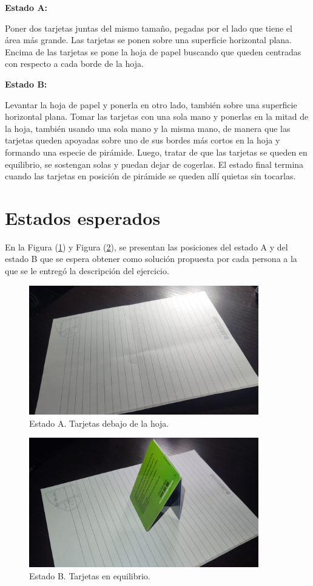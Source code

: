 \documentclass{article}
\begin{document}
\vspace{0.3cm}
\textbf{Estado A:}
\vspace{0.3cm}

Poner dos tarjetas juntas del mismo tamaño, pegadas por el lado que tiene el área más grande. Las tarjetas se ponen sobre una superficie horizontal plana. Encima de las tarjetas se pone la hoja de papel buscando que queden centradas con respecto a cada borde de la hoja.

\vspace{0.3cm}
\textbf{Estado B:}
\vspace{0.3cm}

Levantar la hoja de papel y ponerla en otro lado, también sobre una superficie horizontal plana.
Tomar las tarjetas con una sola mano y ponerlas en la mitad de la hoja, también usando una sola mano y la misma mano, de manera que las tarjetas queden apoyadas sobre uno de sus bordes más cortos en la hoja y formando una especie de pirámide. Luego, tratar de que las tarjetas se queden en equilibrio, se sostengan solas y puedan dejar de cogerlas. El estado final termina cuando las tarjetas en posición de pirámide se queden allí quietas sin tocarlas.

\newpage
\section{Estados esperados} \label{imagenes}

En la Figura (\ref{fig:stateA}) y Figura (\ref{fig:stateB}), se presentan las posiciones del estado A y del estado B que se espera obtener como solución propuesta por cada persona a la que se le entregó la descripción del ejercicio.

\begin{figure}[h]
\includegraphics[width=10cm]{stateA.jpeg}
\centering
\caption{Estado A. Tarjetas debajo de la hoja.}
\label{fig:stateA}
\end{figure}

\begin{figure}[h]
\includegraphics[width=10cm]{stateB.jpeg}
\centering
\caption{Estado B. Tarjetas en equilibrio.}
\label{fig:stateB}
\end{figure}
\end{document}
